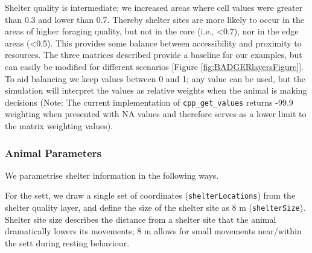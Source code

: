 \documentclass[10pt,a4paper]{article}
\newenvironment{Shaded}{}{}
\newcommand{\AttributeTok}[1]{#1}
\newcommand{\ConstantTok}[1]{#1}
\newcommand{\DecValTok}[1]{#1}
\newcommand{\FloatTok}[1]{#1}
\newcommand{\FunctionTok}[1]{#1}
\newcommand{\NormalTok}[1]{#1}
\newcommand{\OtherTok}[1]{#1}
\newcommand{\SpecialCharTok}[1]{#1}
\newcommand{\StringTok}[1]{#1}
\begin{document}
Shelter quality is intermediate; we increased areas where cell values were greater than 0.3 and lower than 0.7.
Thereby shelter sites are more likely to occur in the areas of higher foraging quality, but not in the core (i.e., \textless0.7), nor in the edge areas (\textless0.5).
This provides some balance between accessibility and proximity to resources.
The three matrices described provide a baseline for our examples, but can easily be modified for different scenarios {[}Figure \ref{fig:BADGERlayersFigure}{]}.
To aid balancing we keep values between 0 and 1; any value can be used, but the simulation will interpret the values as relative weights when the animal is making decisions (Note: The current implementation of \texttt{cpp\_get\_values} returns -99.9 weighting when presented with NA values and therefore serves as a lower limit to the matrix weighting values).

\hypertarget{animal-parameters}{%
\subsubsection{Animal Parameters}\label{animal-parameters}}

We parametrise shelter information in the following ways.

For the sett, we draw a single set of coordinates (\texttt{shelterLocations}) from the shelter quality layer, and define the size of the shelter site as 8 m (\texttt{shelterSize}).
Shelter site size describes the distance from a shelter site that the animal dramatically lowers its movements; 8 m allows for small movements near/within the sett during resting behaviour.

\begin{Shaded}
\end{Shaded}
\end{document}
